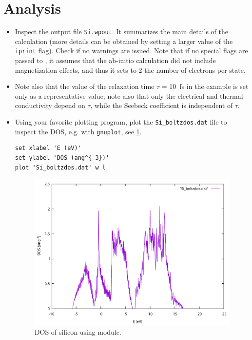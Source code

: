 \documentclass[11pt,a4paper]{article}
\begin{document}
\section{Analysis}
\begin{itemize}
\item Inspect the output file \texttt{Si.wpout}. It summarizes the main details of
the calculation (more details can be obtained by setting a larger value of the
\texttt{iprint} flag). Check if no warnings are issued. Note that if no special
flags are passed to \boltzwan, it assumes that the ab-initio calculation did
not include magnetization effects, and thus it sets to 2 the number of
electrons per state.

\item Note also that the value of the relaxation time $\tau$ = \SI{10}{fs} in the
example is set only as a representative value; note also that only the
electrical and thermal conductivity depend on $\tau$, while the Seebeck
coefficient is independent of $\tau$.

\item Using your favorite plotting program, plot the \texttt{Si\_boltzdos.dat} file
to inspect the DOS, e.g. with \texttt{gnuplot}, see \cref{fig:dos}.
\begin{verbatim}
set xlabel 'E (eV)'
set ylabel 'DOS (ang^{-3})'
plot 'Si_boltzdos.dat' w l
\end{verbatim}
\begin{figure}[htb]
  \centering
  \includegraphics[width=.7\textwidth]{fig/dos.pdf}
  \caption{DOS of silicon using \boltzwan module.}
  \label{fig:dos}
\end{figure}


\end{itemize}
\end{document}
